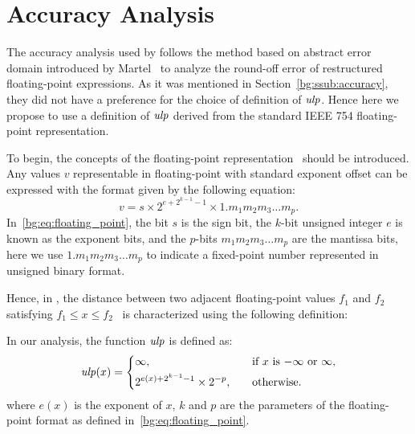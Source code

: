 \section{Accuracy Analysis}
\label{so:sec:accuracy}

The accuracy analysis used by \soap{} follows the method based on abstract
error domain introduced by Martel~\cite{martel07} to analyze the round-off
error of restructured floating-point expressions.  As it was mentioned in
Section~\ref{bg:ssub:accuracy}, they did not have a preference for the choice
of definition of $\operatorname{\mathit{ulp}}$.  Hence here we propose to use a definition of $\operatorname{\mathit{ulp}}$
derived from the standard IEEE 754 floating-point representation.

To begin, the concepts of the floating-point representation~\cite{ieee754}
should be introduced.  Any values $v$ representable in floating-point with
standard exponent offset can be expressed with the format given by the
following equation:
\begin{equation}
    v = s \times 2^{e + 2^{k - 1} - 1} \times 1.{m_1 m_2 m_3 \ldots m_p}.
    \label{bg:eq:floating_point}
\end{equation}
In~\eqref{bg:eq:floating_point}, the bit $s$ is the sign bit, the $k$-bit
unsigned integer $e$ is known as the exponent bits, and the $p$-bits $m_1 m_2
m_3 \ldots m_p$ are the mantissa bits, here we use $1.{m_1 m_2 m_3 \ldots m_p}$
to indicate a fixed-point number represented in unsigned binary format.

Hence, in \soap{}, the distance between two
adjacent floating-point values $f_1$ and $f_2$ satisfying $f_1 \leq x \leq
f_2$~\cite{goldberg} is characterized using the following definition:
\begin{definition}
    In our analysis, the function $\operatorname{\mathit{ulp}}$ is defined as:
    \begin{equation}
        \operatorname{\mathit{ulp}}(x) = \left\{
            \begin{aligned}
                & \infty,  && \text{if $x$ is $-\infty$ or $\infty$}, \\
                & 2^{e(x) + 2^{k - 1} - 1} \times 2^{-p},
                \quad && \text{otherwise}.
            \end{aligned}
        \right.
    \end{equation}
    where $e(x)$ is the exponent of $x$, $k$ and $p$ are the parameters of the
    floating-point format as defined in~\eqref{bg:eq:floating_point}.
    {}\label{so:def:ulp}
\end{definition}


